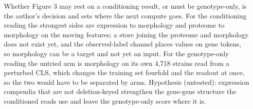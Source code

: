  Whether Figure 3 may rest on a conditioning result, or must be
genotype-only, is the author's decision and sets where the next compute goes. For the
conditioning reading the strongest sides are expression to morphology and proteome to
morphology on the moving features; a store joining the proteome and morphology does not
exist yet, and the observed-label channel places values on gene tokens, so morphology can be
a target and not yet an input. For the genotype-only reading the untried arm is morphology
on its own 4,718 strains read from a perturbed CLS, which changes the training set fourfold
and the readout at once, so the two would have to be separated by arms. Hypothesis
(untested): expression compendia that are not deletion-keyed strengthen the gene-gene
structure the conditioned reads use and leave the genotype-only score where it is.
